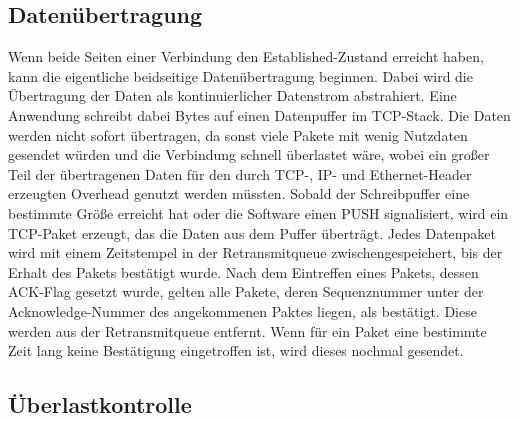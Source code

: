 \subsection{Datenübertragung}

Wenn beide Seiten einer Verbindung den Established-Zustand erreicht haben, kann die eigentliche beidseitige Datenübertragung beginnen. Dabei wird die Übertragung der Daten als kontinuierlicher Datenstrom abstrahiert. Eine Anwendung schreibt dabei Bytes auf einen Datenpuffer im TCP-Stack. Die Daten werden nicht sofort übertragen, da sonst viele Pakete mit wenig Nutzdaten gesendet würden und die Verbindung schnell überlastet wäre, wobei ein großer Teil der übertragenen Daten für den durch TCP-, IP- und Ethernet-Header erzeugten Overhead genutzt werden müssten. Sobald der Schreibpuffer eine bestimmte Größe erreicht hat oder die Software einen PUSH signalisiert, wird ein TCP-Paket erzeugt, das die Daten aus dem Puffer überträgt. Jedes Datenpaket wird mit einem Zeitstempel in der Retransmitqueue zwischengespeichert, bis der Erhalt des Pakets bestätigt wurde. Nach dem Eintreffen eines Pakets, dessen ACK-Flag gesetzt wurde, gelten alle Pakete, deren Sequenznummer unter der Acknowledge-Nummer des angekommenen Paktes liegen, als bestätigt. Diese werden aus der Retransmitqueue entfernt. Wenn für ein Paket eine bestimmte Zeit lang keine Bestätigung eingetroffen ist, wird dieses nochmal gesendet.\cite{TCPr}  

\subsection{Überlastkontrolle}

